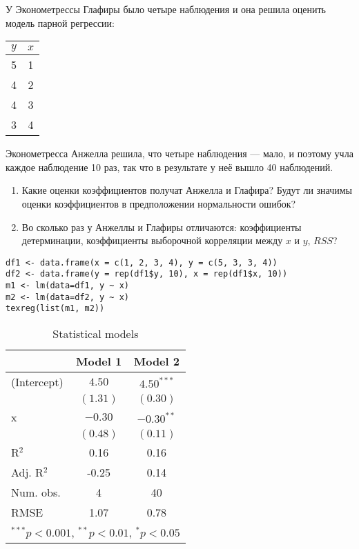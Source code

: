 \begin{problem}
У Эконометрессы Глафиры было четыре наблюдения и она решила оценить модель парной регрессии:

\begin{tabular}{cc}
\toprule
$y$ & $x$ \\
\midrule
5 & 1 \\
4 & 2 \\
4 & 3 \\
3 & 4 \\
\bottomrule
\end{tabular}

Эконометресса Анжелла решила, что четыре наблюдения — мало, и поэтому учла каждое наблюдение 10 раз, так что в результате у неё вышло 40 наблюдений.

\begin{enumerate}
\item Какие оценки коэффициентов получат Анжелла и Глафира? Будут ли значимы оценки коэффициентов в предположении нормальности ошибок?
\item Во сколько раз у Анжеллы и Глафиры отличаются: коэффициенты детерминации, коэффициенты выборочной корреляции между $x$ и $y$, $RSS$?
\end{enumerate}




\begin{sol}

\begin{verbatim}
df1 <- data.frame(x = c(1, 2, 3, 4), y = c(5, 3, 3, 4))
df2 <- data.frame(y = rep(df1$y, 10), x = rep(df1$x, 10))
m1 <- lm(data=df1, y ~ x)
m2 <- lm(data=df2, y ~ x)
texreg(list(m1, m2))
\end{verbatim}

\begin{table}
\begin{center}
\begin{tabular}{l c c }
\hline
 & Model 1 & Model 2 \\
\hline
(Intercept) & $4.50$   & $4.50^{***}$ \\
            & $(1.31)$ & $(0.30)$     \\
x           & $-0.30$  & $-0.30^{**}$ \\
            & $(0.48)$ & $(0.11)$     \\
\hline
R$^2$       & 0.16     & 0.16         \\
Adj. R$^2$  & -0.25    & 0.14         \\
Num. obs.   & 4        & 40           \\
RMSE        & 1.07     & 0.78         \\
\hline
\multicolumn{3}{l}{\scriptsize{$^{***}p<0.001$, $^{**}p<0.01$, $^*p<0.05$}}
\end{tabular}
\caption{Statistical models}
\label{table:coefficients}
\end{center}
\end{table}

\end{sol}
\end{problem}




